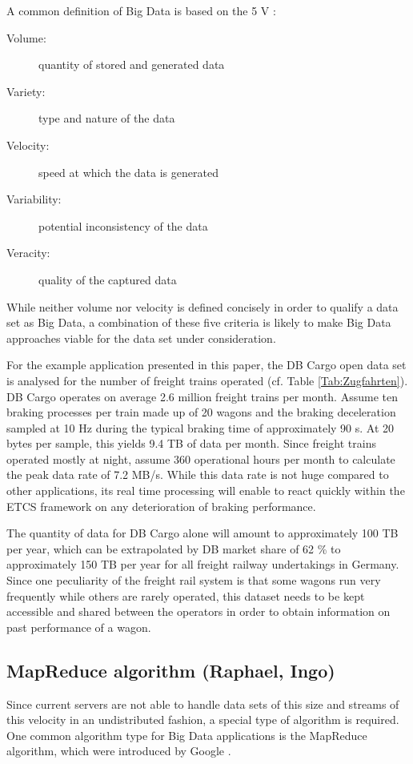 \documentclass[a4paper, 12pt]{scrartcl}
\begin{document}
A common definition of Big Data is based on the 5 V \cite{hilbert2016big}:
\begin{description}
	\item[Volume:] quantity of stored and generated data 
	\item[Variety:] type and nature of the data
	\item[Velocity:] speed at which the data is generated
	\item[Variability:] potential inconsistency of the data
	\item[Veracity:] quality of the captured data
\end{description}
While neither volume nor velocity is defined concisely in order to qualify a data set as Big Data, a combination of these five criteria is likely to make Big Data approaches viable for the data set under consideration.

For the example application presented in this paper, the DB Cargo open data set \cite{DBOpenDataZug} is analysed for the number of freight trains operated (cf. Table \ref{Tab:Zugfahrten}). DB Cargo operates on average 2.6 million freight trains per month. Assume ten braking processes per train made up of 20 wagons and the braking deceleration sampled at 10 Hz during the typical braking time of approximately 90 s. At 20 bytes per sample, this yields 9.4 TB of data per month. Since freight trains operated mostly at night, assume 360 operational hours per month to calculate the peak data rate of 7.2 MB/s. While this data rate is not huge compared to other applications, its real time processing will enable to react quickly within the ETCS framework on any deterioration of braking performance.

The quantity of data for DB Cargo alone will amount to approximately 100 TB per year, which can be extrapolated by DB market share of 62 \% to approximately 150 TB per year for all freight railway undertakings in Germany. Since one peculiarity of the freight rail system is that some wagons run very frequently while others are rarely operated, this dataset needs to be kept accessible and shared between the operators in order to obtain  information on past performance of a wagon.

\subsection{MapReduce algorithm (Raphael, Ingo)}
Since current servers are not able to handle data sets of this size and streams of this velocity in an undistributed fashion, a special type of algorithm is required. One common algorithm type for Big Data applications is the MapReduce algorithm, which were introduced by Google \cite{dean2008mapreduce}.
\end{document}
